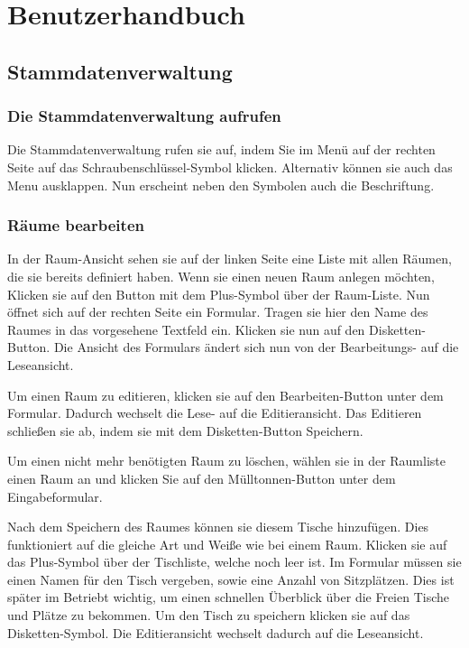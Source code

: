 \section{Benutzerhandbuch}

\subsection{Stammdatenverwaltung}

\subsubsection{Die Stammdatenverwaltung aufrufen}

Die Stammdatenverwaltung rufen sie auf, indem Sie im Menü auf der rechten Seite auf das Schraubenschlüssel-Symbol klicken. Alternativ können sie auch das Menu ausklappen. Nun erscheint neben den Symbolen auch die Beschriftung.

\subsubsection{Räume bearbeiten}

In der Raum-Ansicht sehen sie auf der linken Seite eine Liste mit allen Räumen, die sie bereits definiert haben. Wenn sie einen neuen Raum anlegen möchten, Klicken sie auf den Button mit dem Plus-Symbol über der Raum-Liste. Nun öffnet sich auf der rechten Seite ein Formular. Tragen sie hier den Name des Raumes in das vorgesehene Textfeld ein. Klicken sie nun auf den Disketten-Button. Die Ansicht des Formulars ändert sich nun von der Bearbeitungs- auf die Leseansicht. 

Um einen Raum zu editieren, klicken sie auf den Bearbeiten-Button unter dem Formular. Dadurch wechselt die Lese- auf die Editieransicht. Das Editieren schließen sie ab, indem sie mit dem Disketten-Button Speichern.

Um einen nicht mehr benötigten Raum zu löschen, wählen sie in der Raumliste einen Raum an und klicken Sie auf den Mülltonnen-Button unter dem Eingabeformular.

Nach dem Speichern des Raumes können sie diesem Tische hinzufügen. Dies funktioniert auf die gleiche Art und Weiße wie bei einem Raum. Klicken sie auf das Plus-Symbol über der Tischliste, welche noch leer ist. Im Formular müssen sie einen Namen für den Tisch vergeben, sowie eine Anzahl von Sitzplätzen. Dies ist später im Betriebt wichtig, um einen schnellen Überblick über die Freien Tische und Plätze zu bekommen. Um den Tisch zu speichern klicken sie auf das Disketten-Symbol. Die Editieransicht wechselt dadurch auf die Leseansicht.

